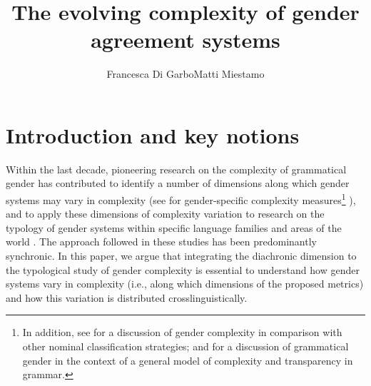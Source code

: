 \documentclass[output=collectionpaper]{langsci/langscibook}
\author{Francesca Di Garbo\affiliation{Stockholm University}\lastand Matti Miestamo\affiliation{University of Helsinki}}%
\title{The evolving complexity of gender agreement systems}
\begin{document}
\maketitle


\section{Introduction and key notions}
\label{intro2}
Within the last decade, pioneering research on the complexity of grammatical gender has contributed to identify a number of dimensions along which gender systems may vary in complexity (see \citealt{Audring2014,Audring2017,DiGarbo2016} for gender-specific complexity measures\footnote{In%
  addition, see \citet{Passer2016b} for a discussion of gender complexity in comparison with other nominal classification strategies; and \citet{Leufkens2015} for a discussion of grammatical gender in the context of a general model of complexity and transparency in grammar.}%
), and to apply these dimensions of complexity variation to research on the typology of gender systems within specific language families and areas of the world \citep{DiGarbo2016}. The approach followed in these studies has been predominantly synchronic. In this paper, we argue that integrating the diachronic dimension to the typological study of gender complexity is essential to understand how gender systems vary in complexity (i.e., along which dimensions of the proposed metrics) and how this variation is distributed crosslinguistically.
\end{document}
